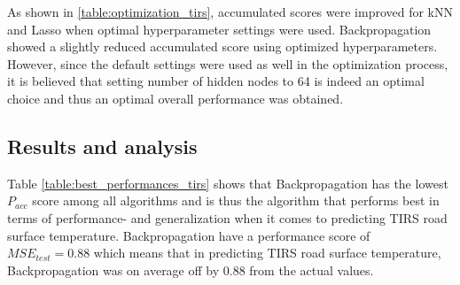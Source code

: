 	As shown in \ref{table:optimization_tirs}, accumulated scores were improved for kNN and Lasso when optimal hyperparameter settings were used. Backpropagation showed a slightly reduced accumulated score using optimized hyperparameters. However, since the default settings were used as well in the optimization process, it is believed that setting number of hidden nodes to 64 is indeed an optimal choice and thus an optimal overall performance was obtained.

	\subsection{Results and analysis} \label{sec:results_tirs}

	\begin{table}[H]
		\centering
		\caption{Shows the overall optimal settings and performances for each of the algorithms in predicting TIRS road surface temperature.}
	\end{table}

	Table \ref{table:best_performances_tirs} shows that Backpropagation has the lowest $P_{acc}$ score among all algorithms and is thus the algorithm that performs best in terms of performance- and generalization when it comes to predicting TIRS road surface temperature. Backpropagation have a performance score of $MSE_{test} = 0.88$ which means that in predicting TIRS road surface temperature, Backpropagation was on average off by 0.88 from the actual values. %

